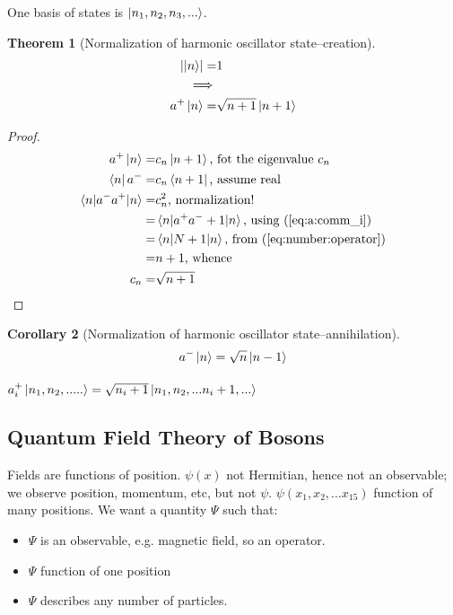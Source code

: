 \documentclass[]{article}
\newtheorem{thm}{Theorem}
\newtheorem{cor}[thm]{Corollary}
\begin{document}
One basis of states is $\ket{n_1,n_2,n_3,...}$.

\begin{thm}[Normalization of harmonic oscillator state--creation]\label{thm:norm:harmonic}
	\begin{align*}
	\left|\ket{n}\right|=&1\\
	\implies&\\
	a^+\ket{n}=&\sqrt{n+1}\ket{n+1}
	\end{align*}
\end{thm} 

\begin{proof}
	\begin{align*}
	a^+\ket{n}=&c_n\ket{n+1} \text{, fot the eigenvalue $c_n$}\\
	\bra{n}a^-=&c_n\bra{n+1}\text{, assume real}\\
	\braket{n|a^-a^+|n}=&c_n^2\text{, normalization!}\\
	=& \braket{n|a^+a^-+1|n}\text{, using (\ref{eq:a:comm_i})}\\
	=& \braket{n|N+1|n} \text{, from (\ref{eq:number:operator})}\\
	=&n+1 \text{, whence}\\
	c_n=&\sqrt{n+1}
	\end{align*}
\end{proof}

\begin{cor}[Normalization of harmonic oscillator state--annihilation]
	\begin{align*}
	a^-\ket{n}=\sqrt{n}\ket{n-1}
	\end{align*}
\end{cor}


$a_i^+\ket{n_1,n_2,.....}=\sqrt{n_i+1}\ket{n_1,n_2,...n_i+1,...}$

\subsection{Quantum Field Theory of Bosons}

Fields are functions of position. $\psi(x)$ not Hermitian, hence not an observable; we observe position, momentum, etc, but not $\psi$. $\psi(x_1,x_2,...x_{15})$ function of many positions. We want a quantity $\Psi$ such that:

\begin{itemize}
	\item $\Psi$ is an observable, e.g. magnetic field, so an operator.
	\item $\Psi$ function of one position
	\item $\Psi$ describes any number of particles.
\end{itemize}
\end{document}
